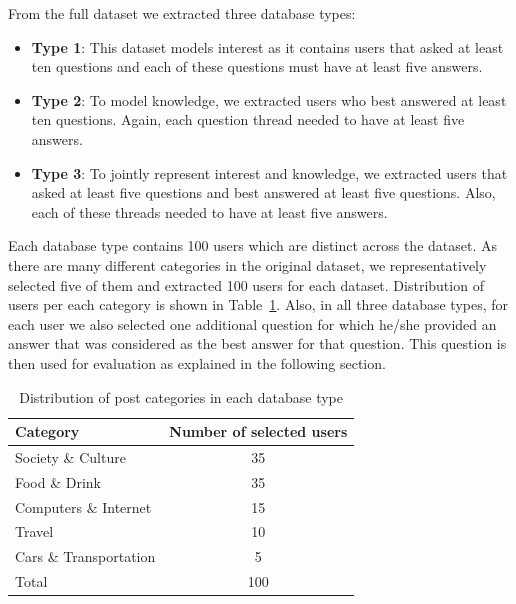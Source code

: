\documentclass[conference]{IEEEtran}
\newcommand{\tblref}[1]{Table~\ref{#1}}
\begin{document}
From the full dataset we extracted three database types:
\begin{itemize}
	\item {\bf Type 1}: This dataset models interest as it contains users that asked at least ten questions and each of these questions must have at least five answers.
	\item {\bf Type 2}: To model knowledge, we extracted users who best answered at least ten questions. Again, each question thread needed to have at least five answers.
	\item {\bf Type 3}: To jointly represent interest and knowledge, we extracted users that asked at least five questions and best answered at least five questions. Also, each of these threads needed to have at least five answers.
\end{itemize}
Each database type contains 100 users which are distinct across the dataset. As there are many different categories in the original dataset, we representatively selected five of them and extracted 100 users for each dataset. Distribution of users per each category is shown in \tblref{tab:datasets}.
Also, in all three database types, for each user we also selected one additional question for which he/she provided an answer that was considered as the best answer for that question. This question is then used for evaluation as explained in the following section. 
\begin{table}[!h]
	\centering
	\renewcommand{\arraystretch}{1.3}
	\caption{Distribution of post categories in each database type}
	\label{tab:datasets}
	\begin{tabular}{l|c}\hline
		Category & Number of selected users\\\hline\hline
		Society \& Culture & 35\\
		Food \& Drink & 35\\
		Computers \& Internet & 15\\
		Travel & 10\\
		Cars \& Transportation & 5\\\hline\hline
		Total & 100\\\hline
	\end{tabular}
\end{table}
\end{document}
